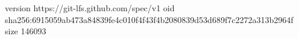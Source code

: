 version https://git-lfs.github.com/spec/v1
oid sha256:6915059ab473a84839fe4c010f4f43f4b2080839d53d689f7c2272a313b2964f
size 146093
